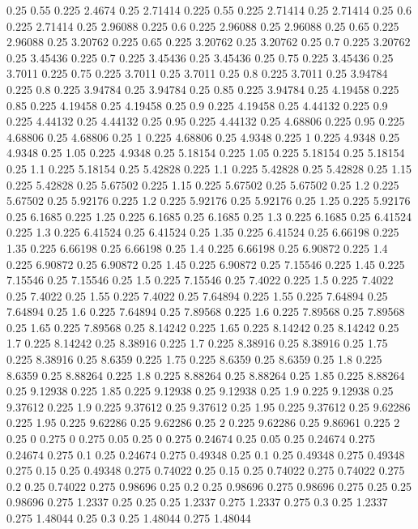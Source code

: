 0.25 0.55
0.225 2.4674
0.25 2.71414
0.225 0.55
0.225 2.71414
0.25 2.71414
0.25 0.6
0.225 2.71414
0.25 2.96088
0.225 0.6
0.225 2.96088
0.25 2.96088
0.25 0.65
0.225 2.96088
0.25 3.20762
0.225 0.65
0.225 3.20762
0.25 3.20762
0.25 0.7
0.225 3.20762
0.25 3.45436
0.225 0.7
0.225 3.45436
0.25 3.45436
0.25 0.75
0.225 3.45436
0.25 3.7011
0.225 0.75
0.225 3.7011
0.25 3.7011
0.25 0.8
0.225 3.7011
0.25 3.94784
0.225 0.8
0.225 3.94784
0.25 3.94784
0.25 0.85
0.225 3.94784
0.25 4.19458
0.225 0.85
0.225 4.19458
0.25 4.19458
0.25 0.9
0.225 4.19458
0.25 4.44132
0.225 0.9
0.225 4.44132
0.25 4.44132
0.25 0.95
0.225 4.44132
0.25 4.68806
0.225 0.95
0.225 4.68806
0.25 4.68806
0.25 1
0.225 4.68806
0.25 4.9348
0.225 1
0.225 4.9348
0.25 4.9348
0.25 1.05
0.225 4.9348
0.25 5.18154
0.225 1.05
0.225 5.18154
0.25 5.18154
0.25 1.1
0.225 5.18154
0.25 5.42828
0.225 1.1
0.225 5.42828
0.25 5.42828
0.25 1.15
0.225 5.42828
0.25 5.67502
0.225 1.15
0.225 5.67502
0.25 5.67502
0.25 1.2
0.225 5.67502
0.25 5.92176
0.225 1.2
0.225 5.92176
0.25 5.92176
0.25 1.25
0.225 5.92176
0.25 6.1685
0.225 1.25
0.225 6.1685
0.25 6.1685
0.25 1.3
0.225 6.1685
0.25 6.41524
0.225 1.3
0.225 6.41524
0.25 6.41524
0.25 1.35
0.225 6.41524
0.25 6.66198
0.225 1.35
0.225 6.66198
0.25 6.66198
0.25 1.4
0.225 6.66198
0.25 6.90872
0.225 1.4
0.225 6.90872
0.25 6.90872
0.25 1.45
0.225 6.90872
0.25 7.15546
0.225 1.45
0.225 7.15546
0.25 7.15546
0.25 1.5
0.225 7.15546
0.25 7.4022
0.225 1.5
0.225 7.4022
0.25 7.4022
0.25 1.55
0.225 7.4022
0.25 7.64894
0.225 1.55
0.225 7.64894
0.25 7.64894
0.25 1.6
0.225 7.64894
0.25 7.89568
0.225 1.6
0.225 7.89568
0.25 7.89568
0.25 1.65
0.225 7.89568
0.25 8.14242
0.225 1.65
0.225 8.14242
0.25 8.14242
0.25 1.7
0.225 8.14242
0.25 8.38916
0.225 1.7
0.225 8.38916
0.25 8.38916
0.25 1.75
0.225 8.38916
0.25 8.6359
0.225 1.75
0.225 8.6359
0.25 8.6359
0.25 1.8
0.225 8.6359
0.25 8.88264
0.225 1.8
0.225 8.88264
0.25 8.88264
0.25 1.85
0.225 8.88264
0.25 9.12938
0.225 1.85
0.225 9.12938
0.25 9.12938
0.25 1.9
0.225 9.12938
0.25 9.37612
0.225 1.9
0.225 9.37612
0.25 9.37612
0.25 1.95
0.225 9.37612
0.25 9.62286
0.225 1.95
0.225 9.62286
0.25 9.62286
0.25 2
0.225 9.62286
0.25 9.86961
0.225 2
0.25 0
0.275 0
0.275 0.05
0.25 0
0.275 0.24674
0.25 0.05
0.25 0.24674
0.275 0.24674
0.275 0.1
0.25 0.24674
0.275 0.49348
0.25 0.1
0.25 0.49348
0.275 0.49348
0.275 0.15
0.25 0.49348
0.275 0.74022
0.25 0.15
0.25 0.74022
0.275 0.74022
0.275 0.2
0.25 0.74022
0.275 0.98696
0.25 0.2
0.25 0.98696
0.275 0.98696
0.275 0.25
0.25 0.98696
0.275 1.2337
0.25 0.25
0.25 1.2337
0.275 1.2337
0.275 0.3
0.25 1.2337
0.275 1.48044
0.25 0.3
0.25 1.48044
0.275 1.48044
